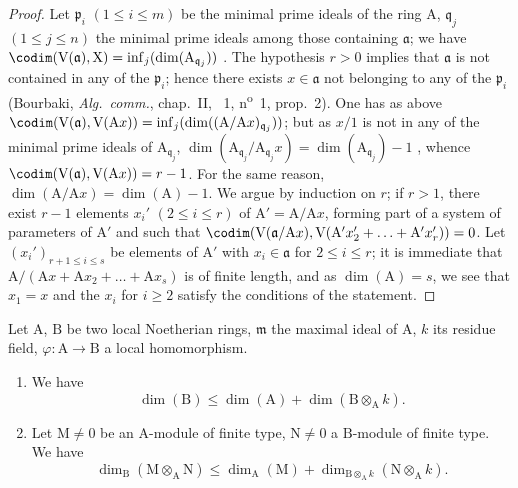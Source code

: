 \begin{proof}
Let $\mathfrak{p}_i$ $(1\leq i\leq m)$ be the minimal prime ideals of the ring $\mathrm{A}$, $\mathfrak{q}_j$ $(1\leq j\leq n)$ the minimal prime ideals among those containing $\mathfrak{a}$; we have  $\codim(\mathrm{V}(\mathfrak{a}),\mathrm{X})=\inf_j(\dim(\mathrm{A}_{\mathfrak{q}_j}))$ .
The hypothesis $r>0$ implies that $\mathfrak{a}$ is not contained in any of the $\mathfrak{p}_i$; hence there exists $x\in\mathfrak{a}$ not belonging to any of the $\mathfrak{p}_i$ (Bourbaki, \emph{Alg.~comm.}, chap.~II, \textsection~1, n\textsuperscript{o}~1, prop.~2).
One has as above $\codim(\mathrm{V}(\mathfrak{a}),\mathrm{V}(\mathrm{A}x))=\inf_j(\dim((\mathrm{A}/\mathrm{A}x)_{\mathfrak{q}_j}))$; but as $x/1$ is not in any of the minimal prime ideals of $\mathrm{A}_{\mathfrak{q}_j}$, $\dim(\mathrm{A}_{\mathfrak{q}_j}/\mathrm{A}_{\mathfrak{q}_j}x)=\dim(\mathrm{A}_{\mathfrak{q}_j})-1$ , whence $\codim(\mathrm{V}(\mathfrak{a}),\mathrm{V}(\mathrm{A}x))=r-1$.
For the same reason, $\dim(\mathrm{A}/\mathrm{A}x)=\dim(\mathrm{A})-1$.
We argue by induction on $r$; if $r>1$, there exist $r-1$ elements $x_i'$ $(2\leq i\leq r)$ of $\mathrm{A}'=\mathrm{A}/\mathrm{A}x$, forming part of a system of parameters of $\mathrm{A}'$ and such that $\codim(\mathrm{V}(\mathfrak{a}/\mathrm{A}x),\mathrm{V}(\mathrm{A}'x_2'+\ldots+\mathrm{A}'x_r'))=0$.
Let $(x_i')_{r+1\leq i\leq s}$ be elements of $\mathrm{A}'$ with $x_i\in\mathfrak{a}$ for $2\leq i\leq r$; it is immediate that $\mathrm{A}/(\mathrm{A}x+\mathrm{A}x_2+\ldots+\mathrm{A}x_s)$ is of finite length, and as $\dim(\mathrm{A})=s$, we see that $x_1=x$ and the $x_i$ for $i\geq 2$ satisfy the conditions of the statement.
\end{proof}

\begin{proposition}[16.3.9]
\label{0.16.3.9}
Let $\mathrm{A}$, $\mathrm{B}$ be two local Noetherian rings, $\mathfrak{m}$ the maximal ideal of $\mathrm{A}$, $k$ its residue field, $\varphi:\mathrm{A}\to\mathrm{B}$ a local homomorphism.
\begin{enumerate}
  \item[\rm{(i)}] We have
  \begin{equation}
  \label{0.16.3.9.1}
  \tag{16.3.9.1}
    \dim(\mathrm{B})\leq\dim(\mathrm{A})+\dim(\mathrm{B}\otimes_\mathrm{A}k).
  \end{equation}
  \item[\rm{(ii)}] Let $\mathrm{M}\neq 0$ be an $\mathrm{A}$-module of finite type, $\mathrm{N}\neq 0$ a $\mathrm{B}$-module of finite type.
  We have
  \begin{equation}
  \label{0.16.3.9.2}
  \tag{16.3.9.2}
    \dim_\mathrm{B}(\mathrm{M}\otimes_\mathrm{A}\mathrm{N})\leq\dim_\mathrm{A}(\mathrm{M})+\dim_{\mathrm{B}\otimes_\mathrm{A}k}(\mathrm{N}\otimes_\mathrm{A}k).
  \end{equation}
\end{enumerate}
\end{proposition}

